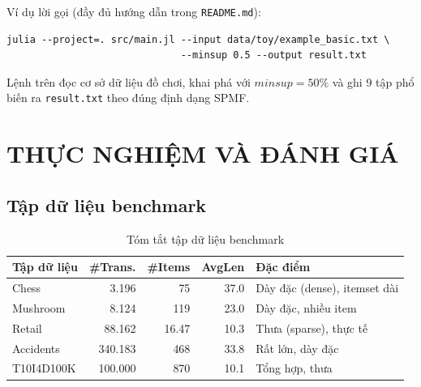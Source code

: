 \documentclass[12pt,a4paper]{report}
\begin{document}
Ví dụ lời gọi (đầy đủ hướng dẫn trong \texttt{README.md}):

\begin{lstlisting}[style=julia, caption={Ví dụ chạy từ dòng lệnh},
                   label={lst:cli-example}]
julia --project=. src/main.jl --input data/toy/example_basic.txt \
                              --minsup 0.5 --output result.txt
\end{lstlisting}

Lệnh trên đọc cơ sở dữ liệu đồ chơi, khai phá với $minsup = 50\%$ và ghi 9 tập
phổ biến ra \texttt{result.txt} theo đúng định dạng SPMF.


\chapter{THỰC NGHIỆM VÀ ĐÁNH GIÁ}
 
 
\section{Tập dữ liệu benchmark}
 
 
\begin{table}[H]
    \centering
    \caption{Tóm tắt tập dữ liệu benchmark}
    \label{tab:datasets}
    \begin{tabularx}{\textwidth}{|l|r|r|r|X|}
    \hline
    \textbf{Tập dữ liệu} & \textbf{\#Trans.} & \textbf{\#Items} & \textbf{AvgLen} & \textbf{Đặc điểm} \\
    \hline
    Chess       & 3.196   & 75    & 37.0 & Dày đặc (dense), itemset dài \\
    \hline
    Mushroom    & 8.124   & 119   & 23.0 & Dày đặc, nhiều item \\
    \hline
    Retail      & 88.162  & 16.47 & 10.3 & Thưa (sparse), thực tế \\
    \hline
    Accidents   & 340.183 & 468   & 33.8 & Rất lớn, dày đặc \\
    \hline
    T10I4D100K  & 100.000 & 870   & 10.1 & Tổng hợp, thưa \\
    \hline
    \end{tabularx}
\end{table}
 
\end{document}
